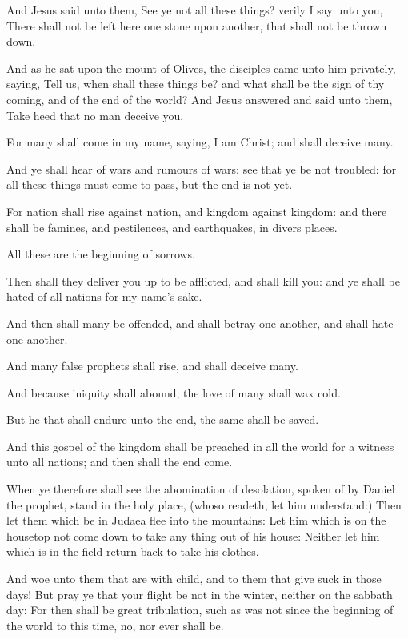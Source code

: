 \verse And Jesus said unto them, See ye not all these things? verily I say unto you, There shall not be left here one stone upon another, that shall not be thrown down.

\verse And as he sat upon the mount of Olives, the disciples came unto him privately, saying, Tell us, when shall these things be? and what shall be the sign of thy coming, and of the end of the world?  \verse And Jesus answered and said unto them, Take heed that no man deceive you.

\verse For many shall come in my name, saying, I am Christ; and shall deceive many.

\verse And ye shall hear of wars and rumours of wars: see that ye be not troubled: for all these things must come to pass, but the end is not yet.

\verse For nation shall rise against nation, and kingdom against kingdom: and there shall be famines, and pestilences, and earthquakes, in divers places.

\verse All these are the beginning of sorrows.

\verse Then shall they deliver you up to be afflicted, and shall kill you: and ye shall be hated of all nations for my name's sake.

\verse And then shall many be offended, and shall betray one another, and shall hate one another.

\verse And many false prophets shall rise, and shall deceive many.

\verse And because iniquity shall abound, the love of many shall wax cold.

\verse But he that shall endure unto the end, the same shall be saved.

\verse And this gospel of the kingdom shall be preached in all the world for a witness unto all nations; and then shall the end come.

\verse When ye therefore shall see the abomination of desolation, spoken of by Daniel the prophet, stand in the holy place, (whoso readeth, let him understand:) \verse Then let them which be in Judaea flee into the mountains: \verse Let him which is on the housetop not come down to take any thing out of his house: \verse Neither let him which is in the field return back to take his clothes.

\verse And woe unto them that are with child, and to them that give suck in those days!  \verse But pray ye that your flight be not in the winter, neither on the sabbath day: \verse For then shall be great tribulation, such as was not since the beginning of the world to this time, no, nor ever shall be.

